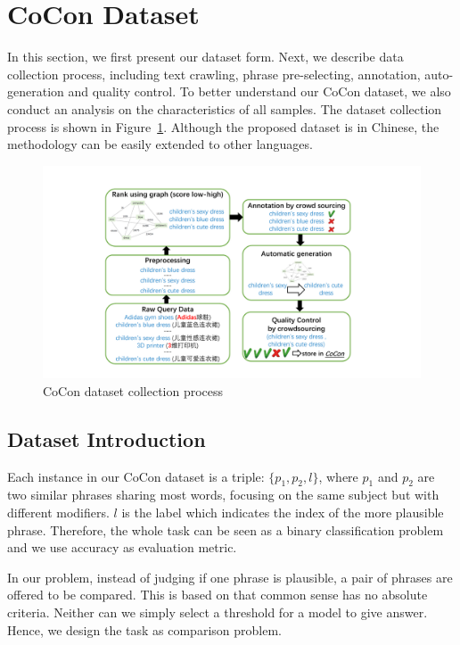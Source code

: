 \section{CoCon Dataset}
\label{sec:cocon}
In this section, we first present our dataset form. Next, we describe data collection process, including text crawling, phrase pre-selecting, annotation, auto-generation and quality control. To better understand our CoCon dataset, we also conduct an analysis on the characteristics of all samples. The dataset collection process is shown in Figure~\ref{fig:framework}. Although the proposed dataset is in Chinese, the methodology can be easily extended to other languages.

\begin{figure}
	\centering
	\includegraphics[width=\columnwidth]{images/framework.pdf}
	\caption{CoCon dataset collection process}
	\label{fig:framework}
\end{figure}

\subsection{Dataset Introduction}
Each instance in our CoCon dataset is a triple: $\{p_1, p_2, l\}$, where $p_1$ and $p_2$ are two similar phrases sharing most words, focusing on the same subject
but with different modifiers.
$l$ is the label which indicates the index of the more plausible phrase. 
Therefore, the whole task can be seen as a binary classification problem 
and we use accuracy as evaluation metric. 

In our problem, instead of judging if one phrase is plausible, a pair of phrases are offered to be compared. This is based on that common sense has no absolute criteria. 
Neither can we simply select a threshold for a model to give answer. Hence, we design the task as comparison problem.


